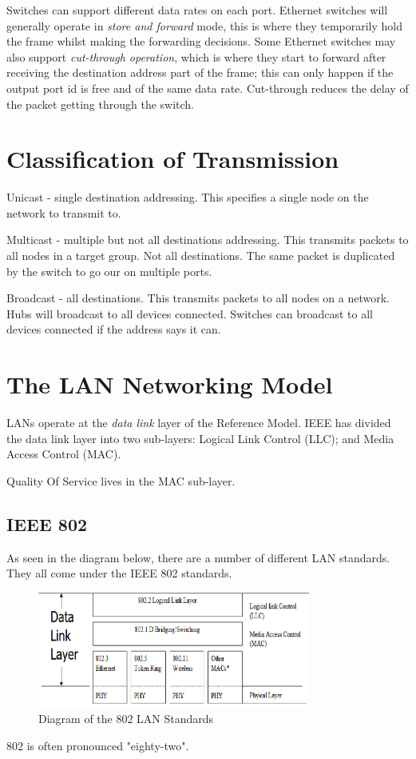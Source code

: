 Switches can support different data rates on each port. Ethernet switches will generally operate in \textit{store and forward} mode, this is where they temporarily hold the frame whilst making the forwarding decisions. Some Ethernet switches may also support \textit{cut-through operation}, which is where they start to forward after receiving the destination address part of the frame; this can only happen if the output port id is free and of the same data rate. Cut-through reduces the delay of the packet getting through the switch.

\section*{Classification of Transmission}
Unicast - single destination addressing. This specifies a single node on the network to transmit to.

Multicast - multiple but not all destinations addressing. This transmits packets to all nodes in a target group. Not all destinations. The same packet is duplicated by the switch to go our on multiple ports.

Broadcast - all destinations. This transmits packets to all nodes on a network. Hubs will broadcast to all devices connected. Switches can broadcast to all devices connected if the address says it can. 

\section*{The LAN Networking Model}
LANs operate at the \textit{data link} layer of the Reference Model. IEEE has divided the data link layer into two sub-layers: Logical Link Control (LLC); and Media Access Control (MAC).

Quality Of Service lives in the MAC sub-layer.
\subsection*{IEEE 802}
As seen in the diagram below, there are a number of different LAN standards. They all come under the IEEE 802 standards.
\begin{figure}[H]
    \centering
    \includegraphics[width=0.8\textwidth]{assets/802-layers.png}
    \caption{Diagram of the 802 LAN Standards}
\end{figure}
802 is often pronounced "eighty-two". 
